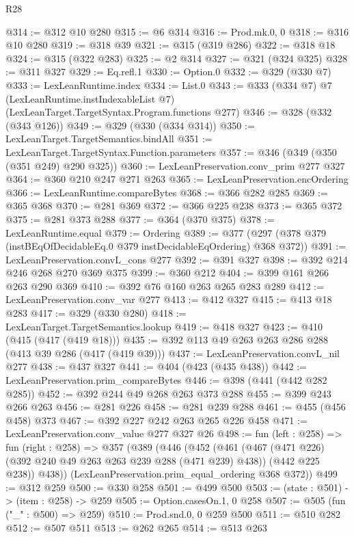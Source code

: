 \begin{lexlean}{R28}
\begin{coremodule}
@314 := @312 @10 @280
@315 := @6 @314
@316 := Prod.mk.{0, 0}
@318 := @316 @10 @280
@319 := @318 @39
@321 := @315 (@319 @286)
@322 := @318 @18
@324 := @315 (@322 @283)
@325 := @2 @314
@327 := @321 (@324 @325)
@328 := @311 @327
@329 := Eq.refl.{1}
@330 := Option.{0}
@332 := @329 (@330 @7)
@333 := LexLeanRuntime.index
@334 := List.{0}
@343 := @333
    (@334 @7)
    @7
    (LexLeanRuntime.instIndexableList @7)
    (LexLeanTarget.TargetSyntax.Program.functions @277)
@346 := @328 (@332 (@343 @126))
@349 := @329 (@330 (@334 @314))
@350 := LexLeanTarget.TargetSemantics.bindAll
@351 := LexLeanTarget.TargetSyntax.Function.parameters
@357 := @346 (@349 (@350 (@351 @249) @290 @325))
@360 := LexLeanPreservation.conv_prim @277 @327
@364 := @360 @210 @247 @271 @263
@365 := LexLeanPreservation.encOrdering
@366 := LexLeanRuntime.compareBytes
@368 := @366 @282 @285
@369 := @365 @368
@370 := @281 @369
@372 := @366 @225 @238
@373 := @365 @372
@375 := @281 @373 @288
@377 := @364 (@370 @375)
@378 := LexLeanRuntime.equal
@379 := Ordering
@389 := @377 (@297 (@378 @379 (instBEqOfDecidableEq.{0} @379 instDecidableEqOrdering) @368 @372))
@391 := LexLeanPreservation.convL_cons @277
@392 := @391 @327
@398 := @392 @214 @246 @268 @270 @369 @375
@399 := @360 @212
@404 := @399 @161 @266 @263 @290 @369
@410 := @392 @76 @160 @263 @265 @283 @289
@412 := LexLeanPreservation.conv_var @277
@413 := @412 @327
@415 := @413 @18 @283
@417 := @329 (@330 @280)
@418 := LexLeanTarget.TargetSemantics.lookup
@419 := @418 @327
@423 := @410 (@415 (@417 (@419 @18)))
@435 := @392 @113 @49 @263 @263 @286 @288 (@413 @39 @286 (@417 (@419 @39)))
@437 := LexLeanPreservation.convL_nil @277
@438 := @437 @327
@441 := @404 (@423 (@435 @438))
@442 := LexLeanPreservation.prim_compareBytes
@446 := @398 (@441 (@442 @282 @285))
@452 := @392 @244 @49 @268 @263 @373 @288
@455 := @399 @243 @266 @263
@456 := @281 @226
@458 := @281 @239 @288
@461 := @455 (@456 @458) @373
@467 := @392 @227 @242 @263 @265 @226 @458
@471 := LexLeanPreservation.conv_value @277 @327 @26
@498 := fun (left : @258) =>
  fun (right : @258) =>
  @357
    (@389
      (@446
        (@452
          (@461
            (@467 (@471 @226) (@392 @240 @49 @263 @263 @239 @288 (@471 @239) @438))
            (@442 @225 @238))
          @438))
      (LexLeanPreservation.prim_equal_ordering @368 @372))
@499 := @312 @259
@500 := @330 @258
@501 := @499 @500
@503 := (state : @501) -> (item : @258) -> @259
@505 := Option.casesOn.{1, 0} @258
@507 := @505 (fun ("_" : @500) => @259)
@510 := Prod.snd.{0, 0} @259 @500
@511 := @510 @282
@512 := @507 @511
@513 := @262 @265
@514 := @513 @263

\end{coremodule}
\end{lexlean}
